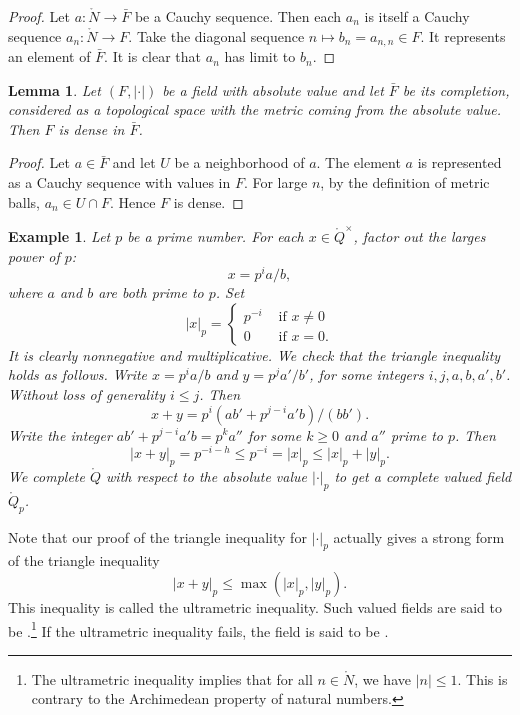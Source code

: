 \documentclass{amsart}
\newtheorem{lemma}[equation]{Lemma}
\newtheorem{example}[exercise]{Example}
\def\abs#1{{|#1|}}
\begin{document}
\begin{proof} Let $a:\ring{N}\to \bar F$ be a Cauchy sequence.
Then each $a_n$ is itself a Cauchy sequence $a_n:\ring{N}\to F$.
Take the diagonal sequence $n\mapsto b_n = a_{n,n}\in F$.  It represents an
element of $\bar F$.  It is clear that $a_n$ has limit
to $b_n$.
\end{proof}


\begin{lemma} Let $(F,\abs{\cdot})$ be a field with absolute value and
let $\bar F$ be its completion, considered as a topological space with
the metric coming from the absolute value.  Then $F$ is dense in $\bar F$.
\end{lemma}

\begin{proof} Let $a\in \bar F$ and let $U$ be a neighborhood of $a$.
  The element $a$ is represented as a Cauchy sequence with values in
  $F$.  For large $n$, by the definition of metric balls, $a_n\in
  U\cap F$.  Hence $F$ is dense.
\end{proof}

\begin{example} Let $p$ be a prime number.  For each
  $x\in\ring{Q}^\times$, factor out the larges power of $p$:
\[
x = p^i a/b,
\]
where $a$ and $b$ are both prime to $p$.
Set
\[
\abs{x}_p = \begin{cases} p^{-i}&\text{ if } x\ne 0\\
  0&\text{ if } x = 0.
  \end{cases}
\]
It is clearly nonnegative and multiplicative.  We check that the
triangle inequality holds as follows.  Write $x = p^i a/b$ and $y =
p^j a'/b'$, for some integers $i,j,a,b,a',b'$.  Without loss of
generality $i\le j$.  Then
\[
x + y = p^i (a b' + p^{j-i} a' b)/(b b').
\]
Write the integer $a b' + p^{j-i} a' b = p^k a''$ for some $k\ge 0$
and $a''$ prime to $p$.  Then
\[
\abs{x+y}_p = p^{-i-h} \le p^{-i} = \abs{x}_p \le \abs{x}_p + \abs{y}_p.
\]
We complete $\ring{Q}$ with respect to the absolute value
$\abs{\cdot}_p$ to get a complete valued field $\ring{Q}_p$.
\end{example}

Note that our proof of the triangle inequality for $\abs{\cdot}_p$ actually
gives a strong form of the triangle inequality
\begin{equation}
\abs{x+y}_p \le \max(\abs{x}_p,\abs{y}_p).
\end{equation}
This inequality is called the ultrametric inequality.  Such valued fields
are said to be .\footnote{The ultrametric inequality
implies that for all $n\in\ring{N}$, we have $\abs{n}\le 1$.  This is
contrary to the Archimedean property of natural numbers.}  
If the ultrametric inequality fails,
the field is said to be .
\end{document}
